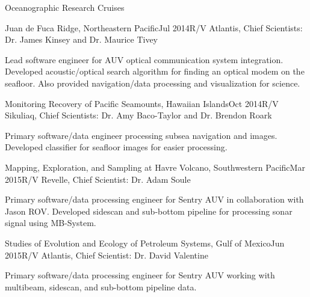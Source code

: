 \documentclass{resume} %
\begin{document}
\begin{rSection}{Oceanographic Research Cruises}
\begin{rSubsection}{Juan de Fuca Ridge, Northeastern Pacific}{Jul 2014}{R/V Atlantis, Chief Scientists: Dr. James Kinsey and Dr. Maurice Tivey}{}
\item{Lead software engineer for AUV optical communication system integration. Developed acoustic/optical search algorithm for finding an optical modem on the seafloor. Also provided navigation/data processing and visualization for science.}
\end{rSubsection}


\begin{rSubsection}{Monitoring Recovery of Pacific Seamounts, Hawaiian Islands}{Oct 2014}{R/V Sikuliaq, Chief Scientists: Dr. Amy Baco-Taylor and Dr. Brendon Roark}{}
\item{Primary software/data engineer processing subsea navigation and images. Developed classifier for seafloor images for easier processing.}
\end{rSubsection}


\begin{rSubsection}{Mapping, Exploration, and Sampling at Havre Volcano, Southwestern Pacific}{Mar 2015}{R/V Revelle, Chief Scientist: Dr. Adam Soule}{}
\item{Primary software/data processing engineer for Sentry AUV in collaboration with Jason ROV. Developed sidescan and sub-bottom pipeline for processing sonar signal using MB-System.}
\end{rSubsection}


\begin{rSubsection}{Studies of Evolution and Ecology of Petroleum Systems, Gulf of Mexico}{Jun 2015}{R/V Atlantis, Chief Scientist: Dr. David Valentine}{}
\item{Primary software/data processing engineer for Sentry AUV working with multibeam, sidescan, and sub-bottom pipeline data.}
\end{rSubsection}
\end{rSection}




%
%
%
%
%
%
\end{document}
